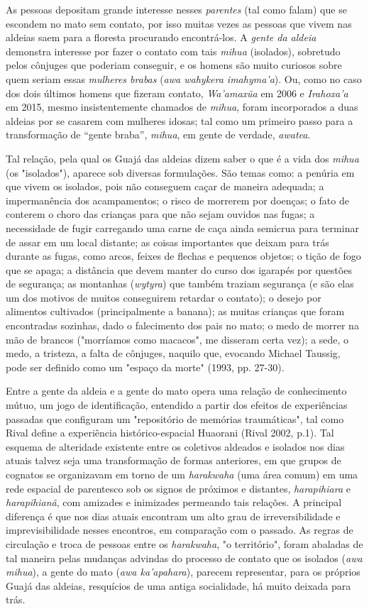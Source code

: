 As pessoas depositam grande interesse nesses \emph{parentes} (tal como
falam) que se escondem no mato sem contato, por isso muitas vezes as
pessoas que vivem nas aldeias saem para a floresta procurando
encontrá-los. A \emph{gente da aldeia} demonstra interesse por fazer o
contato com tais \emph{mihua} (isolados), sobretudo pelos cônjuges que
poderiam conseguir, e os homens são muito curiosos sobre quem seriam
essas \emph{mulheres brabas} (\emph{awa wahykera imahyma'a}). Ou, como
no caso dos dois últimos homens que fizeram contato, \emph{Wa'amaxũa} em
2006 e \emph{Irahoxa'a} em 2015, mesmo insistentemente chamados de
\emph{mihua}, foram incorporados a duas aldeias por se casarem com
mulheres idosas; tal como um primeiro passo para a transformação de
``gente braba'', \emph{mihua}, em gente de verdade, \emph{awatea}.

Tal relação, pela qual os Guajá das aldeias dizem saber o que é a vida
dos \emph{mihua} (os "isolados"), aparece sob diversas formulações. São
temas como: a penúria em que vivem os isolados, pois não conseguem caçar
de maneira adequada; a impermanência dos acampamentos; o risco de
morrerem por doenças; o fato de conterem o choro das crianças para que
não sejam ouvidos nas fugas; a necessidade de fugir carregando uma carne
de caça ainda semicrua para terminar de assar em um local distante; as
coisas importantes que deixam para trás durante as fugas, como arcos,
feixes de flechas e pequenos objetos; o tição de fogo que se apaga; a
distância que devem manter do curso dos igarapés por questões de
segurança; as montanhas (\emph{wytyra}) que também traziam segurança (e
são elas um dos motivos de muitos conseguirem retardar o contato); o
desejo por alimentos cultivados (principalmente a banana); as muitas
crianças que foram encontradas sozinhas, dado o falecimento dos pais no
mato; o medo de morrer na mão de brancos ("morríamos como macacos", me
disseram certa vez); a sede, o medo, a tristeza, a falta de cônjuges,
naquilo que, evocando Michael Taussig, pode ser definido como um "espaço
da morte" (1993, pp. 27-30).

Entre a gente da aldeia e a gente do mato opera uma relação de
conhecimento mútuo, um jogo de identificação, entendido a partir dos
efeitos de experiências passadas que configuram um "repositório de
memórias traumáticas", tal como Rival define a experiência
histórico-espacial Huaorani (Rival 2002, p.1). Tal esquema de alteridade
existente entre os coletivos aldeados e isolados nos dias atuais talvez
seja uma transformação de formas anteriores, em que grupos de cognatos
se organizavam em torno de um \emph{harakwaha} (uma área comum) em uma
rede espacial de parentesco sob os signos de próximos e distantes,
\emph{harapihiara} e \emph{harapihianã}, com amizades e inimizades
permeando tais relações. A principal diferença é que nos dias atuais
encontram um alto grau de irreversibilidade e imprevisibilidade nesses
encontros, em comparação com o passado. As regras de circulação e troca
de pessoas entre os \emph{harakwaha}, "o território", foram abaladas de
tal maneira pelas mudanças advindas do processo de contato que os
isolados (\emph{awa mihua}), a gente do mato (\emph{awa ka'apahara}),
parecem representar, para os próprios Guajá das aldeias, resquícios de
uma antiga socialidade, há muito deixada para trás.

